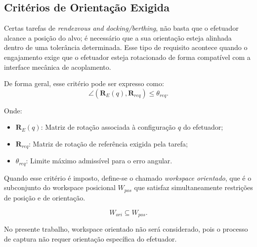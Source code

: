 \subsection{Critérios de Orientação Exigida}
\label{sec:criterios_orientacao_exigida}

Certas tarefas de \emph{rendezvous and docking/berthing}, não basta que o efetuador alcance a posição do alvo; é necessário que a sua orientação esteja alinhada dentro de uma tolerância determinada.  
Esse tipo de requisito acontece quando o engajamento exige que o efetuador esteja rotacionado de forma compatível com a interface mecânica de acoplamento.

De forma geral, esse critério pode ser expresso como:
\begin{equation}
\label{eq:workspace_orientado}
\angle(\mathbf{R}_E(q), \mathbf{R}_{req}) \leq \theta_{req}.
\end{equation}

Onde:
\begin{itemize}
    \item $\mathbf{R}_E(q)$: Matriz de rotação associada à configuração $q$ do efetuador;
    \item $\mathbf{R}_{req}$: Matriz de rotação de referência exigida pela tarefa;
    \item $\theta_{req}$: Limite máximo admissível para o erro angular.
\end{itemize}

Quando esse critério é imposto, define-se o chamado \emph{workspace orientado}, que é o subconjunto do workspace posicional $W_{pos}$ que satisfaz simultaneamente restrições de posição e de orientação.

\begin{equation}
W_{ori} \subseteq W_{pos}.
\end{equation}

No presente trabalho, workspace orientado não será considerado, pois o processo de captura não requer orientação específica do efetuador.
